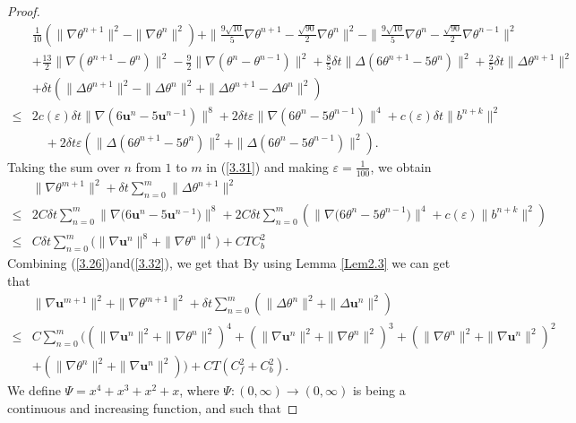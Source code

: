 \documentclass[10pt]{article}
\begin{document}
\begin{proof}
		\begin{align}\label{3.31}
			&\frac{1}{10}(\|\nabla\theta^{n+1}\|^2-\|\nabla\theta^{n}\|^2)+\|\frac{9\sqrt{10}}{5}\nabla\theta^{n+1}-\frac{\sqrt{90}}{2}\nabla\theta^{n}\|^2-\|\frac{9\sqrt{10}}{5}\nabla\theta^{n}-\frac{\sqrt{90}}{2}\nabla\theta^{n-1}\|^2\nonumber\\
			&  +\frac{13}{2}\|\nabla(\theta^{n+1}-\theta^n)\|^2-\frac{9}{2}\|\nabla(\theta^{n}-\theta^{n-1})\|^2+\frac{8}{5}\delta t\|\Delta(6\theta^{n+1}-5\theta^n)\|^2+\frac{2}{5}\delta t\|\Delta\theta^{n+1}\|^2\nonumber\\
			&  +\delta t(\|\Delta\theta^{n+1}\|^2-\|\Delta\theta^{n}\|^2+\|\Delta\theta^{n+1}-\Delta\theta^{n}\|^2)\nonumber\\
			\leq & { 2 c(\varepsilon) \delta t\|\nabla(6\bm{u}^{n}-5\bm{u}^{n-1})\|^8}+2\delta t \varepsilon\|\nabla(6\theta^{n}-5\theta^{n-1})\|^4+c(\varepsilon)\delta t\|b^{n+k}\|^2 \nonumber\\
			&\quad+2\delta t \varepsilon(\|\Delta(6\theta^{n+1}-5\theta^n)\|^2+\|\Delta(6\theta^{n} - 5\theta^{n-1})\|^2).
		\end{align}
		Taking the sum over \( n \) from \( 1 \) to \( m \) in (\ref{3.31}) and making \( \varepsilon = \frac{1}{100} \), we obtain
		{ 
		\begin{align}\label{3.32}
			& \|\nabla\theta^{m+1}\|^2+\delta t\sum_{n=0}^{m}\|\Delta\theta^{n+1}\|^2\nonumber\\
			 \leq& 2C\delta t \sum_{n=0}^{m}\big\|\nabla\big(6\bm{u}^{n}-5\bm{u}^{n-1}\big)\big\|^8
			+ 2C\delta t \sum_{n=0}^{m}(\big\|\nabla\big(6\theta^{n}-5\theta^{n-1}\big)\big\|^4
			+ c(\varepsilon)\|b^{n+k}\|^2)\nonumber \\
			 \leq& C\delta t\sum_{n=0}^{m}\big(\|\nabla\bm{u}^n\|^8+\|\nabla\theta^n\|^4\big) + CTC_b^2
		\end{align}}
		Combining (\ref{3.26})and(\ref{3.32}), we get that
		By using Lemma \ref{Lem2.3} we can get that
		{ 
		\begin{align}\label{3.33}
			&\|\nabla\bm{u}^{m+1}\|^2+\|\nabla\theta^{m+1}\|^2+\delta t\sum_{n=0}^{m}(\|\Delta\theta^{n}\|^2+\|\Delta\bm{u}^n\|^2)\nonumber\\
			\leq & C\sum_{n=0}^{m}((\|\nabla\bm{u}^n\|^2+\|\nabla\theta^{n}\|^2)^4+(\|\nabla\bm{u}^n\|^2+\|\nabla\theta^{n}\|^2)^3+(\|\nabla\theta^n\|^2+\|\nabla\bm{u}^n\|^2)^2\nonumber\\
			& +(\|\nabla\theta^n\|^2+\|\nabla\bm{u}^n\|^2))+CT(C_f^2+C_b^2).
		\end{align}}
	{ 
	We define \(\Psi = x^4 + x^3 + x^2+x \), where \(\Psi: (0, \infty) \to (0, \infty) \) is being a continuous and increasing function, and such that}

\end{proof}
\end{document}
